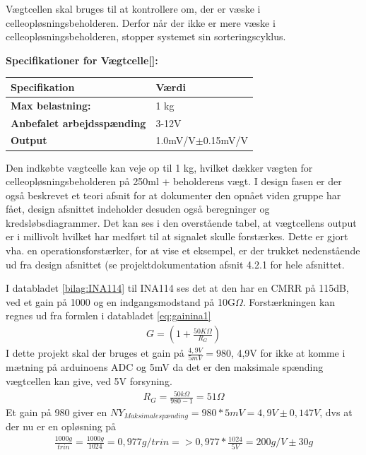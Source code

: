 \label{subsec:loadcell}
Vægtcellen skal bruges til at kontrollere om, der er væske i celleopløsningsbeholderen. Derfor når der ikke er mere væske i celleopløsningsbeholderen, stopper systemet sin sorteringscyklus.

\textbf{Specifikationer for Vægtcelle[\citet{DH7}]:} 
\begin{center}
		\begin{longtable}{ | m{6.5cm} | m{6.5cm}| } 
			\hline
			\textbf{Specifikation} &\textbf{Værdi} \\ 
			\hline
			\textbf{Max belastning:} & 1 kg \\ 
			\hline
			\textbf{Anbefalet arbejdsspænding} & 3-12V \\ 
			\hline
			\textbf{Output} & 1.0mV/V$\pm$0.15mV/V \\ 
			\hline
		\end{longtable}
\end{center}

Den indkøbte vægtcelle kan veje op til 1 kg, hvilket dækker vægten for celleopløsningsbeholderen på 250ml + beholderens vægt. I design fasen er der også beskrevet et teori afsnit for at dokumenter den opnået viden gruppe har fået, design afsnittet indeholder desuden også beregninger og kredsløbsdiagrammer. Det kan ses i den overstående tabel, at vægtcellens output er i millivolt hvilket har medført til at signalet skulle forstærkes. Dette er gjort vha. en operationsforstærker, for at vise et eksempel, er der trukket nedenstående ud fra design afsnittet (se projektdokumentation afsnit 4.2.1  for hele afsnittet. 

I databladet \ref{bilag:INA114} til INA114 ses det at den har en CMRR på 115dB, ved et gain på 1000 og en indgangsmodstand på 10G$\Omega$. Forstærkningen kan regnes ud fra formlen i databladet \ref{eq:gainina1}
\begin{align}
 G=(1+\frac{50K\Omega}{R_{G}})
 \label{eq:gainina1}
 \end{align} 
 I dette projekt skal der bruges et gain på $\frac{4,9V}{5mV}=980$, 4,9V for ikke at komme i mætning på arduinoens ADC og 5mV da det er den maksimale spænding vægtcellen kan give, ved 5V forsyning.
 \begin{align}
 R_{G}=\frac{50k\Omega}{980-1}=51\Omega
 \label{eq:gainina2}
 \end{align}
Et gain på 980 giver en $NY_{Maksimalespænding}=980*5mV=4,9V \pm0,147V$, dvs at der nu er en opløsning på
\begin{align}
 \frac{1000g}{trin}=\frac{1000g}{1024}=0,977g/trin=>0,977*\frac{1024}{5V}=200g/V \pm30g
 \label{eq:gainina3}
 \end{align}
 
